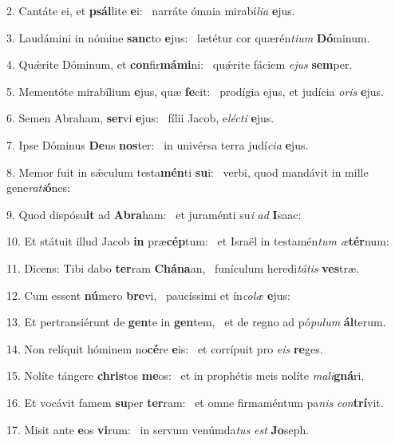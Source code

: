 2. Cantáte ei, et \textbf{psál}lite \textbf{e}i: \ast\  narráte ómnia mirabí\textit{li}\textit{a} \textbf{e}jus.\

3. Laudámini in nómine \textbf{sanc}to \textbf{e}jus: \ast\  lætétur cor quærén\textit{ti}\textit{um} \textbf{Dó}minum.\

4. Quǽrite Dóminum, et \textbf{con}fir\textbf{má}\textbf{mi}ni: \ast\  quǽrite fáciem \textit{e}\textit{jus} \textbf{sem}per.\

5. Mementóte mirabílium \textbf{e}jus, quæ \textbf{fe}cit: \ast\  prodígia ejus, et judícia \textit{o}\textit{ris} \textbf{e}jus.\

6. Semen Abraham, \textbf{ser}vi \textbf{e}jus: \ast\  fílii Jacob, e\textit{léc}\textit{ti} \textbf{e}jus.\

7. Ipse Dóminus \textbf{De}us \textbf{nos}ter: \ast\  in univérsa terra judí\textit{ci}\textit{a} \textbf{e}jus.\

8. Memor fuit in sǽculum testa\textbf{mén}ti \textbf{su}i: \ast\  verbi, quod mandávit in mille gene\textit{ra}\textit{ti}\textbf{ó}nes:\

9. Quod dispósu\textbf{it} ad \textbf{A}\textbf{bra}ham: \ast\  et juraménti su\textit{i} \textit{ad} \textbf{I}saac:\

10. Et státuit illud Jacob \textbf{in} præ\textbf{cép}tum: \ast\  et Israël in testamén\textit{tum} \textit{æ}\textbf{tér}num:\

11. Dicens: Tibi dabo \textbf{ter}ram \textbf{Chá}\textbf{na}an, \ast\  funículum heredi\textit{tá}\textit{tis} \textbf{ves}træ.\

12. Cum essent \textbf{nú}mero \textbf{bre}vi, \ast\  paucíssimi et ín\textit{co}\textit{læ} \textbf{e}jus:\

13. Et pertransiérunt de \textbf{gen}te in \textbf{gen}tem, \ast\  et de regno ad pó\textit{pu}\textit{lum} \textbf{ál}terum.\

14. Non relíquit hóminem no\textbf{cé}re \textbf{e}is: \ast\  et corrípuit pro \textit{e}\textit{is} \textbf{re}ges.\

15. Nolíte tángere \textbf{chris}tos \textbf{me}os: \ast\  et in prophétis meis nolíte \textit{ma}\textit{li}\textbf{gná}ri.\

16. Et vocávit famem \textbf{su}per \textbf{ter}ram: \ast\  et omne firmaméntum pa\textit{nis} \textit{con}\textbf{trí}vit.\

17. Misit ante \textbf{e}os \textbf{vi}rum: \ast\  in servum venúmda\textit{tus} \textit{est} \textbf{Jo}seph.\

